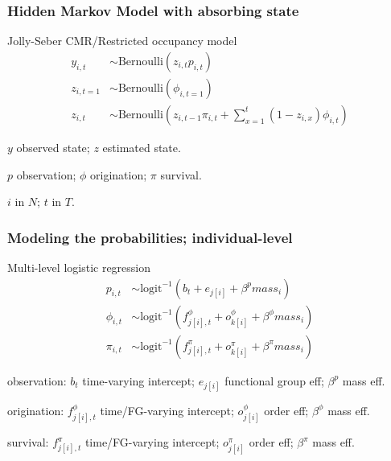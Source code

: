 \documentclass[aspectratio=169]{beamer}
\begin{document}
\begin{frame}
  \frametitle{Hidden Markov Model with absorbing state}
  \begin{block}{Jolly-Seber CMR/Restricted occupancy model}
    \begin{align*}
      y_{i, t} &\sim \text{Bernoulli}(z_{i, t} p_{i, t}) \\
      z_{i, t = 1} &\sim \text{Bernoulli}(\phi_{i, t = 1}) \\
      z_{i, t} &\sim \text{Bernoulli}\left(z_{i, t - 1} \pi_{i,t} + \sum_{x = 1}^{t}(1 - z_{i, x}) \phi_{i, t}\right)
    \end{align*}
    \begin{scriptsize}
      \(y\) observed state; \(z\) estimated state.

      \(p\) observation; \(\phi\) origination; \(\pi\) survival.

      \(i\) in \(N\); \(t\) in \(T\).
    \end{scriptsize}
  \end{block}
\end{frame}

\begin{frame}
  \frametitle{Modeling the probabilities; individual-level}
  \begin{block}{Multi-level logistic regression}
    \begin{align*}
      p_{i, t} &\sim \text{logit}^{-1}(b_{t} + e_{j[i]} + \beta^{p} mass_{i}) \\
      \phi_{i, t} &\sim \text{logit}^{-1}(f^{\phi}_{j[i], t} + o^{\phi}_{k[i]} + \beta^{\phi} mass_{i}) \\
      \pi_{i, t} &\sim \text{logit}^{-1}(f^{\pi}_{j[i], t} + o^{\pi}_{k[i]} + \beta^{\pi} mass_{i})
    \end{align*}
    \begin{scriptsize}
      observation: \(b_{t}\) time-varying intercept; \(e_{j[i]}\) functional group eff; \(\beta^{p}\) mass eff.

      origination: \(f^{\phi}_{j[i], t}\) time/FG-varying intercept; \(o^{\phi}_{j[i]}\) order eff; \(\beta^{\phi}\) mass eff.

      survival: \(f^{\pi}_{j[i], t}\) time/FG-varying intercept; \(o^{\pi}_{j[i]}\) order eff; \(\beta^{\pi}\) mass eff.
    \end{scriptsize}
  \end{block}
\end{frame}
\end{document}
